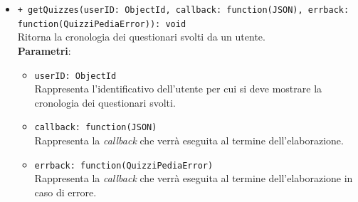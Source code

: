 \begin{itemize}
\begin{itemize}
			\item \texttt{+ getQuizzes(userID: ObjectId, callback: function(JSON), errback: function(QuizziPediaError)): void}\\
			Ritorna la cronologia dei questionari svolti da un utente.\\
			\textbf{Parametri}:
			\begin{itemize}
				\item \texttt{userID: ObjectId}\\
				Rappresenta l'identificativo dell'utente per cui si deve mostrare la cronologia dei questionari svolti.
				\item \texttt{callback: function(JSON)}\\
				Rappresenta la \textit{callback} che verrà eseguita al termine dell'elaborazione.
				\item \texttt{errback: function(QuizziPediaError)}\\
				Rappresenta la \textit{callback} che verrà eseguita al termine dell'elaborazione in caso di errore.
			\end{itemize}
		\end{itemize}
\end{itemize}